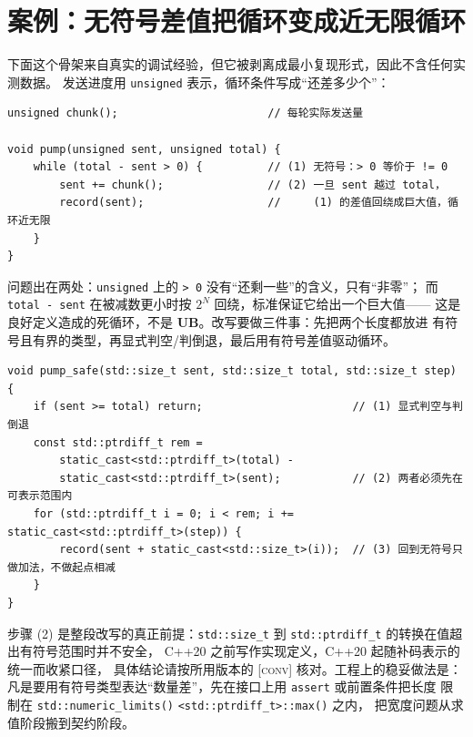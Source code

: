 \documentclass[12pt,a4paper,fontset=fandol]{ctexbook}
\newcommand{\cpp}[1]{C++#1}
\newcommand{\Fn}[1]{\texttt{#1()}}
\newcommand{\Tp}[1]{\texttt{#1}}
\newcommand{\Bk}{\discretionary{}{}{}}
\newcommand{\UB}{\textbf{\textsf{UB}}}
\newcommand{\Std}[1]{\textsc{[#1]}}
\begin{document}
\section{案例：无符号差值把循环变成近无限循环}\label{sec:ub09-case}

下面这个骨架来自真实的调试经验，但它被剥离成最小复现形式，因此不含任何实测数据。
发送进度用 \Tp{unsigned} 表示，循环条件写成“还差多少个”：

\begin{casebox}[title={回绕的差值与带 \Tp{ptrdiff\_t} 的改写}]
\begin{lstlisting}[style=cppstyle, caption={反例：用无符号差值当循环条件}]
unsigned chunk();                       // 每轮实际发送量

void pump(unsigned sent, unsigned total) {
    while (total - sent > 0) {          // (1) 无符号：> 0 等价于 != 0
        sent += chunk();                // (2) 一旦 sent 越过 total，
        record(sent);                   //     (1) 的差值回绕成巨大值，循环近无限
    }
}
\end{lstlisting}

问题出在两处：\Tp{unsigned} 上的 \Tp{> 0} 没有“还剩一些”的含义，只有“非零”；
而 \Tp{total - sent} 在被减数更小时按 $2^N$ 回绕，标准保证它给出一个巨大值——
这是良好定义造成的死循环，不是 \UB{}。改写要做三件事：先把两个长度都放进
有符号且有界的类型，再显式判空/判倒退，最后用有符号差值驱动循环。

\begin{lstlisting}[style=cppstyle, caption={改写：显式判界与 \Tp{ptrdiff\_t} 差值}]
void pump_safe(std::size_t sent, std::size_t total, std::size_t step) {
    if (sent >= total) return;                       // (1) 显式判空与判倒退
    const std::ptrdiff_t rem =
        static_cast<std::ptrdiff_t>(total) -
        static_cast<std::ptrdiff_t>(sent);           // (2) 两者必须先在可表示范围内
    for (std::ptrdiff_t i = 0; i < rem; i += static_cast<std::ptrdiff_t>(step)) {
        record(sent + static_cast<std::size_t>(i));  // (3) 回到无符号只做加法，不做起点相减
    }
}
\end{lstlisting}

步骤 (2) 是整段改写的真正前提：\Tp{std::size\_t} 到
\Tp{std::ptrdiff\_t} 的转换在值超出有符号范围时并不安全，
\cpp{20} 之前写作实现定义，\cpp{20} 起随补码表示的统一而收紧口径，
具体结论请按所用版本的 \Std{conv} 核对。工程上的稳妥做法是：
凡是要用有符号类型表达“数量差”，先在接口上用 \Tp{assert} 或前置条件把长度
限制在 \Fn{std::numeric{\Bk}\_limits} \Tp{<std::ptrdiff{\Bk}\_t>::max()} 之内，
把宽度问题从求值阶段搬到契约阶段。
\end{casebox}
\end{document}
